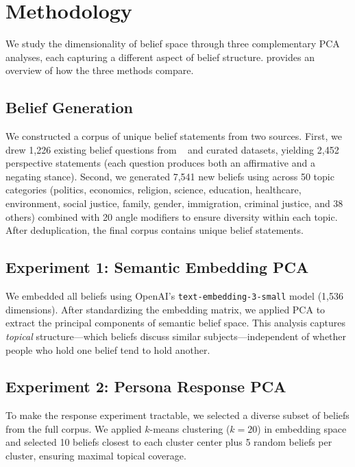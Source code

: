 \section{Methodology}
\label{sec:method}

We study the dimensionality of belief space through three complementary PCA analyses, each capturing a different aspect of belief structure.  provides an overview of how the three methods compare.

\subsection{Belief Generation}
\label{sec:belief_gen}

We constructed a corpus of \nbeliefs unique belief statements from two sources. First, we drew 1,226 existing belief questions from \opinionqa~\cite{santurkar2023whose} and curated datasets, yielding 2,452 perspective statements (each question produces both an affirmative and a negating stance). Second, we generated 7,541 new beliefs using \gptmini across 50 topic categories (politics, economics, religion, science, education, healthcare, environment, social justice, family, gender, immigration, criminal justice, and 38 others) combined with 20 angle modifiers to ensure diversity within each topic. After deduplication, the final corpus contains \nbeliefs unique belief statements.

\subsection{Experiment 1: Semantic Embedding PCA}
\label{sec:embed_pca}

We embedded all \nbeliefs beliefs using OpenAI's \texttt{text-embedding-3-small} model (1,536 dimensions). After standardizing the embedding matrix, we applied PCA to extract the principal components of semantic belief space. This analysis captures {\em topical} structure---which beliefs discuss similar subjects---independent of whether people who hold one belief tend to hold another.

\subsection{Experiment 2: Persona Response PCA}
\label{sec:response_pca}

To make the response experiment tractable, we selected a diverse subset of \nbeliefsub beliefs from the full corpus. We applied $k$-means clustering ($k=20$) in embedding space and selected 10 beliefs closest to each cluster center plus 5 random beliefs per cluster, ensuring maximal topical coverage.

